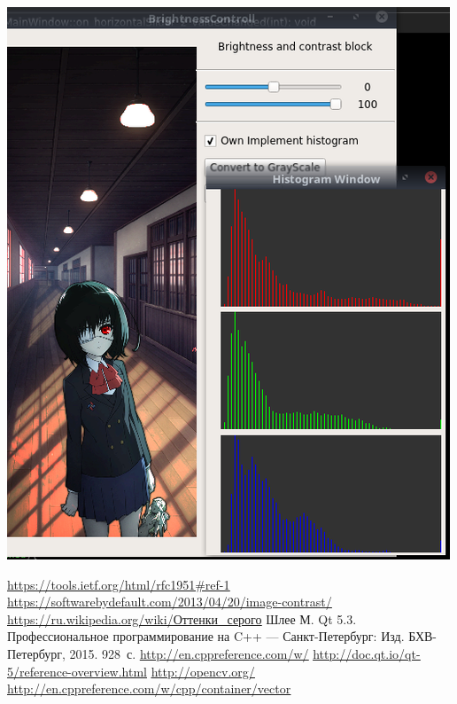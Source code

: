 \documentclass[russian,a4paper,12pt]{scrartcl}
\begin{document}
\begin{center}
		\includegraphics{kek2}\\ 
	\end{center}
	\newpage
	\begin{thebibliography}{15}
		\href{https://tools.ietf.org/html/rfc1951#ref-1}{\underline{https://tools.ietf.org/html/rfc1951#ref-1}}
		\href{https://softwarebydefault.com/2013/04/20/image-contrast/}{\underline{https://softwarebydefault.com/2013/04/20/image-contrast/}}
		\href{https://ru.wikipedia.org/wiki/Оттенки\_серого}{\underline{https://ru.wikipedia.org/wiki/Оттенки\_серого}}
		Шлее М. Qt 5.3. Профессиональное программирование на C++ \newblock --- Санкт-Петербург:
		Изд.  БХВ-Петербург, 2015. 928~с.
		 \href{http://en.cppreference.com/w/}{\underline{http://en.cppreference.com/w/}}
		 \href{http://doc.qt.io/qt-5/reference-overview.html}{\underline{http://doc.qt.io/qt-5/reference-overview.html}}
		 \href{http://opencv.org/}{\underline{http://opencv.org/}}
		 \href{http://en.cppreference.com/w/cpp/container/vector}{\underline{http://en.cppreference.com/w/cpp/container/vector}}
	\end{thebibliography}
\end{document}
